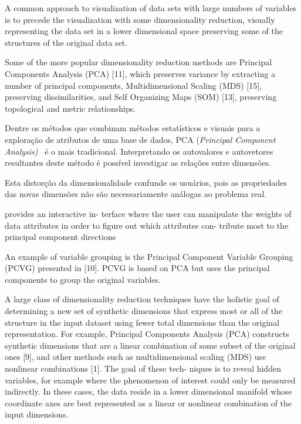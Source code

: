 A common approach to visualization of data sets with large numbers of variables is to precede the visualization with some dimensionality reduction, visually representing the data set in a lower dimensional space preserving some of the structures of the original data set.

Some of the more popular dimensionality reduction methods are
Principal Components Analysis (PCA) [11], which preserves variance by extracting a number of principal components, Multidimensional Scaling (MDS) [15], preserving dissimilarities, and Self Organizing Maps (SOM) [13], preserving topological and metric relationships. 



Dentre os métodos que combinam métodos estatísticos e visuais para a exploração de atributos de uma base de dados, PCA (\textit{Principal Component Analysis)}~\cite{Wold1987} é o mais tradicional. Interpretando os autovalores e autovetores resultantes deste método é possível investigar as relações entre dimensões. 

Esta distorção da dimensionalidade confunde os usuários, pois as propriedades das novas dimensões não são necessariamente análogas ao problema real.


provides an interactive in- terface where the user can manipulate the weights of data attributes in order to figure out which attributes con- tribute most to the principal component directions


An example of variable grouping is the Principal Component Variable Grouping (PCVG) presented in [10]. PCVG is based on PCA but uses the principal components to group the original variables.



A large class of dimensionality reduction techniques have the
holistic goal of determining a new set of synthetic dimensions that express most or all of the structure in the input dataset using fewer total dimensions than the original representation. For example, Principal Components Analysis (PCA) constructs synthetic dimensions that are a linear combination of some subset of the original ones [9], and other methods such as multidimensional scaling (MDS) use nonlinear combinations [1]. The goal of these tech- niques is to reveal hidden variables, for example where the phenomenon of interest could only be measured indirectly. In these cases, the data reside in a lower dimensional manifold whose coordinate axes are best represented as a linear or nonlinear combination of the input dimensions.

